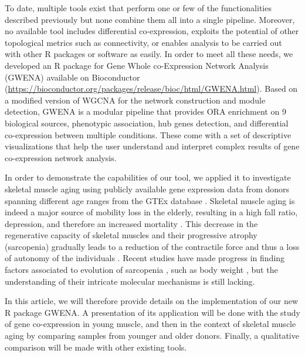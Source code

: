 To date, multiple tools exist that perform one or few of the functionalities described previously but none combine them all into a single pipeline. Moreover, no available tool includes differential co-expression, exploits the potential of other topological metrics such as connectivity, or enables analysis to be carried out with other R packages or software as easily. In order to meet all these needs, we developed an R package for Gene Whole co-Expression Network Analysis (GWENA) available on Bioconductor (\url{https://bioconductor.org/packages/release/bioc/html/GWENA.html}). Based on a modified version of WGCNA for the network construction and module detection, GWENA is a modular pipeline that provides ORA enrichment on 9 biological sources, phenotypic association, hub genes detection, and differential co-expression between multiple conditions. These come with a set of descriptive visualizations that help the user understand and interpret complex results of gene co-expression network analysis.

In order to demonstrate the capabilities of our tool, we applied it to investigate skeletal muscle aging using publicly available gene expression data from donors spanning different age ranges from the GTEx database . Skeletal muscle aging is indeed a major source of mobility loss in the elderly, resulting in a high fall ratio, depression, and therefore an increased mortality . This decrease in the regenerative capacity of skeletal muscles and their progressive atrophy (sarcopenia)  gradually leads to a reduction of the contractile force and thus a loss of autonomy of the individuals . Recent studies have made progress in finding factors associated to evolution of sarcopenia , such as body weight , but the understanding of their intricate molecular mechanisms is still lacking.

In this article, we will therefore provide details on the implementation of our new R package GWENA. A presentation of its application will be done with the study of gene co-expression in young muscle, and then in the context of skeletal muscle aging by comparing samples from younger and older donors.  Finally, a qualitative comparison will be made with other existing tools.




